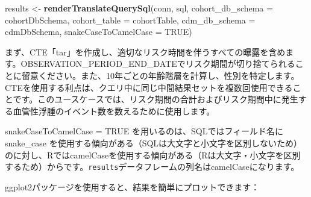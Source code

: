 \documentclass[
  11pt]{book}
\newenvironment{Shaded}{\begin{snugshade}}{\end{snugshade}}
\newcommand{\AttributeTok}[1]{\textcolor[rgb]{0.13,0.29,0.53}{#1}}
\newcommand{\CommentTok}[1]{\textcolor[rgb]{0.56,0.35,0.01}{\textit{#1}}}
\newcommand{\ConstantTok}[1]{\textcolor[rgb]{0.56,0.35,0.01}{#1}}
\newcommand{\DecValTok}[1]{\textcolor[rgb]{0.00,0.00,0.81}{#1}}
\newcommand{\FunctionTok}[1]{\textcolor[rgb]{0.13,0.29,0.53}{\textbf{#1}}}
\newcommand{\NormalTok}[1]{#1}
\newcommand{\OtherTok}[1]{\textcolor[rgb]{0.56,0.35,0.01}{#1}}
\newcommand{\SpecialCharTok}[1]{\textcolor[rgb]{0.81,0.36,0.00}{\textbf{#1}}}
\newcommand{\StringTok}[1]{\textcolor[rgb]{0.31,0.60,0.02}{#1}}
\theoremstyle{definition}
\theoremstyle{definition}
\theoremstyle{definition}
\theoremstyle{definition}
\theoremstyle{remark}
\begin{document}
\begin{Shaded}
\begin{Highlighting}[]
\NormalTok{results }\OtherTok{\textless{}{-}} \FunctionTok{renderTranslateQuerySql}\NormalTok{(conn, sql,}
                                   \AttributeTok{cohort\_db\_schema =}\NormalTok{ cohortDbSchema,}
                                   \AttributeTok{cohort\_table =}\NormalTok{ cohortTable,}
                                   \AttributeTok{cdm\_db\_schema =}\NormalTok{ cdmDbSchema,}
                                   \AttributeTok{snakeCaseToCamelCase =} \ConstantTok{TRUE}\NormalTok{)}
\end{Highlighting}
\end{Shaded}

まず、CTE「tar」を作成し、適切なリスク時間を伴うすべての曝露を含めます。OBSERVATION\_PERIOD\_END\_DATEでリスク期間が切り捨てられることに留意ください。また、10年ごとの年齢階層を計算し、性別を特定します。CTEを使用する利点は、クエリ中に同じ中間結果セットを複数回使用できることです。このユースケースでは、リスク期間の合計およびリスク期間中に発生する血管性浮腫のイベント数を数えるために使用します。

snakeCaseToCamelCase = TRUE を用いるのは、SQLではフィールド名にsnake\_case を使用する傾向がある（SQLは大文字と小文字を区別しないため）のに対し、RではcamelCaseを使用する傾向がある（Rは大文字・小文字を区別するため）からです。\texttt{results}データフレームの列名はcamelCaseになります。

ggplot2パッケージを使用すると、結果を簡単にプロットできます：

\begin{Shaded}
\end{Shaded}
\end{document}
